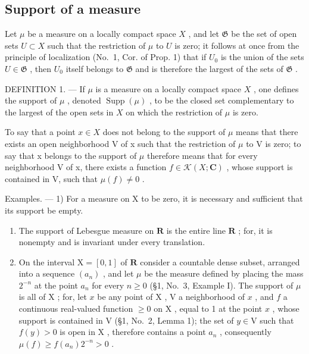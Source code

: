 \subsection{Support of a measure}

Let \(\mu\) be a measure on a locally compact space \(X\) , and let \(\mathfrak{G}\) be the set of open sets \(U \subset X\) such that the restriction of \(\mu\) to \(U\) is zero; it follows at once from the principle of localization (No.~1, Cor. of Prop. 1) that if \(U_0\) is the union of the sets \(U \in \mathfrak{G}\) , then \(U_0\) itself belongs to \(\mathfrak{G}\) and is therefore the largest of the sets of \(\mathfrak{G}\) .

DEFINITION 1. --- If \(\mu\) is a measure on a locally compact space \(X\) , one defines the support of \(\mu\) , denoted \(\operatorname{Supp}(\mu)\) , to be the closed set complementary to the largest of the open sets in \(X\) on which the restriction of \(\mu\) is zero.

To say that a point \(x \in X\) does not belong to the support of \(\mu\) means that there exists an open neighborhood V of x such that the restriction of \(\mu\) to V is zero; to say that x belongs to the support of \(\mu\) therefore means that for every neighborhood V of x, there exists a function \(f \in \mathcal{K}(X; \mathbf{C})\) , whose support is contained in V, such that \(\mu(f) \neq 0\) .

Examples. --- 1) For a measure on X to be zero, it is necessary and sufficient that its support be empty.

\begin{enumerate}
\def\labelenumi{\arabic{enumi})}
\setcounter{enumi}{1}
\item
  The support of Lebesgue measure on \(\mathbf{R}\) is the entire line \(\mathbf{R}\) ; for, it is nonempty and is invariant under every translation.
\item
  On the interval \(\mathrm{X} = [0,1]\) of \(\mathbf{R}\) consider a countable dense subset, arranged into a sequence \((a_n)\) , and let \(\mu\) be the measure defined by placing the mass \(2^{-n}\) at the point \(a_n\) for every \(n \geqslant 0\) (§1, No.~3, Example I). The support of \(\mu\) is all of \(\mathrm{X}\) ; for, let \(x\) be any point of \(\mathrm{X}\) , \(\mathrm{V}\) a neighborhood of \(x\) , and \(f\) a continuous real-valued function \(\geqslant 0\) on \(\mathrm{X}\) , equal to 1 at the point \(x\) , whose support is contained in \(\mathrm{V}\) (§1, No.~2, Lemma 1); the set of \(y \in \mathrm{V}\) such that \(f(y) > 0\) is open in \(\mathrm{X}\) , therefore contains a point \(a_n\) , consequently \(\mu(f) \geqslant f(a_n)2^{-n} > 0\) .
\end{enumerate}

